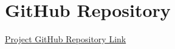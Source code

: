 


\appendix
	\label{app:Appendix}
	\section{GitHub Repository}
		\href{https://github.com/paymog/4420-Research-Paper}{Project GitHub Repository Link}


%
%
%
%
%
%
